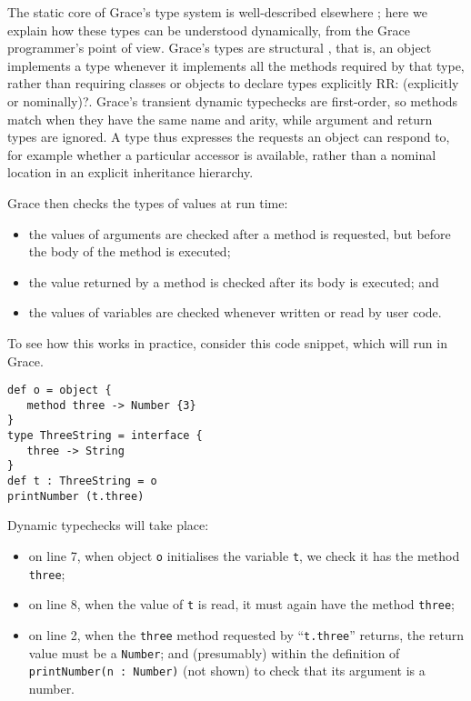 \documentclass[sigplan,10pt,review,screen]{acmart}\settopmatter{printfolios=true}
\newcommand{\code}[1]{\texttt{#1}}
\newcommand{\RR}[1]{{\color{red}RR: #1}}
\begin{document}
The static core of Grace's type system is well-described
elsewhere \citep{TimJonesThesis};
here we explain how
these types can be understood 
dynamically, from the Grace programmer's point of view.
Grace's types are structural \citep{graceOnward12},
that is, an object implements a type whenever it
implements all the methods required by that type,
rather than requiring classes or objects to declare types explicitly \RR{(explicitly or nominally)?}. 
Grace's transient dynamic typechecks are first-order, so methods match when they have
the same name and arity, while
argument and return types are ignored.
A type thus expresses the requests an object can respond to,
for example whether a particular accessor is available,
rather than a nominal location in an explicit inheritance hierarchy.

Grace then checks the types of values at run time:
%
\begin{itemize}
\item the values of arguments are checked after a method is requested, 
      but before the body of the method is executed;
\item the value returned by a method is checked after its body is executed; and
\item the values of variables are checked
      whenever written or read by user code.
\end{itemize}

To see how this works in practice, consider this code snippet, which
will run in Grace.

\begin{minipage}{\linewidth}
\begin{lstlisting}
def o = object {
   method three -> Number {3}
}
type ThreeString = interface {
   three -> String
}
def t : ThreeString = o
printNumber (t.three)
\end{lstlisting}
\end{minipage}

Dynamic typechecks will take place: 

\begin{itemize}

\item on line 7,
when object \code{o} initialises the variable \code{t},
we check it has the method \code{three};

\item on line 8,
when the value of \code{t} is read,
it must again have the method \code{three};

\item on line 2,
when the \code{three} method requested by ``\code{t.three}'' returns,
the return value must be a \code{Number};
and (presumably) within the definition of
%
\code{printNumber(n :   Number)}
%
(not shown) to check that its argument is a number. 
\end{itemize}
\end{document}
